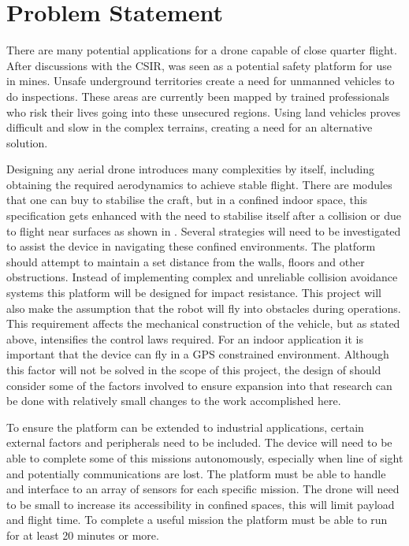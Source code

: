 	\section{Problem Statement}
	There are many potential applications for a drone capable of close quarter flight. After discussions with the CSIR, \projectName was seen as a potential safety platform for use in mines. Unsafe underground territories create a need for unmanned vehicles to do inspections. These areas are currently been mapped by trained professionals who risk their lives going into these unsecured regions. Using land vehicles proves difficult and slow in the complex terrains, creating a need for an alternative solution.
	
	Designing any aerial drone introduces many complexities by itself, including obtaining the required aerodynamics to achieve stable flight. There are modules that one can buy to stabilise the craft, but in a confined indoor space, this specification gets enhanced with the need to stabilise itself after a collision or due to flight near surfaces as shown in \cite{}. 
	Several strategies will need to be investigated to assist the device in navigating these confined environments. The platform should attempt to maintain a set distance from the walls, floors and other obstructions.
	Instead of implementing complex and unreliable collision avoidance systems this platform will be designed for impact resistance. This project will also make the assumption that the robot will fly into obstacles during operations. This requirement affects the mechanical construction of the vehicle, but as stated above, intensifies the control laws required.
	For an indoor application it is important that the device can fly in a GPS constrained environment. Although this factor will not be solved in the scope of this project, the design of \projectName should consider some of the factors involved to ensure expansion into that research can be done with relatively small changes to the work accomplished here.
	
	To ensure the platform can be extended to industrial applications, certain external factors and peripherals need to be included. The device will need to be able to complete some of this missions autonomously, especially when line of sight and potentially communications are lost.
	The platform must be able to handle and interface to an array of sensors for each specific mission. The drone will need to be small to increase its accessibility in confined spaces, this will limit payload and flight time. To complete a useful mission the platform must be able to run for at least 20 minutes  or more.
	
